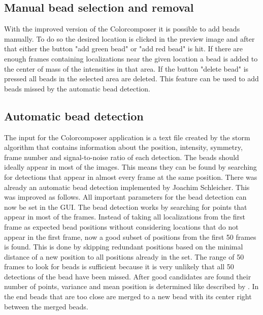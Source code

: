 \subsection{Manual bead selection and removal}
With the improved version of the Colorcomposer it is possible to add beads manually. To do so the desired location is clicked in the preview image and after that either the button "add green bead" or "add red bead" is hit. If there are enough frames containing localizations near the given location a bead is added to the center of mass of the intensities in that area. If the button "delete bead" is pressed all beads in the selected area are deleted.\newline
This feature can be used to add beads missed by the automatic bead detection.
\subsection{Automatic bead detection}
The input for the Colorcomposer application is a text file created by the storm
algorithm that contains information about the position, intensity, symmetry,
frame number and signal-to-noise ratio of each detection. The beads should
ideally appear in most of the images. This means they can be found by searching for
detections that appear in almost every frame at the same position.\newline
There was already an automatic bead detection implemented by Joachim Schleicher. This was improved as follows.\newline
All important parameters for the bead detection can now be set in the GUI. The bead detection works by searching for points that appear in most of the frames. Instead of taking all localizations from the first frame as expected bead positions without considering locations that do not appear in the first frame, now a good subset of positions from the first 50 frames is found. This is done by skipping redundant positions based on the minimal distance of a new position to all positions already in the set. The range of 50 frames to look for beads is sufficient because it is very unlikely that all 50 detections of the bead have been missed.\newline
After good candidates are found their number of points, variance and mean position is determined like described by \cite{MAJoachim}.\newline
In the end beads that are too close are merged to a new bead with its center right between the merged beads.

